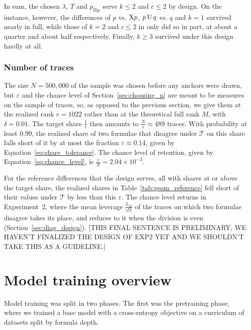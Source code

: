 \documentclass[titlepage,a4paper,11pt]{report}
\DeclareRobustCommand{\RStodo}[1]{\leavevmode{\color{orange!85!black}\textbf{[TODO:}~#1\textbf{]}}}
\begin{document}
    In sum, the chosen $\lambda$, $T$ and $p_{\text{flip}}$ serve $k\le2$ and $c\le2$ by design. On the instance, however, the differences of $p$ vs. $\text{X} p$, $p\,\text{U}\,q$ vs. $q$ and $k=1$ survived nearly in full, while those of $k=2$ and $c\le2$ in only did so in part, at about a quarter and about half respectively. Finally, $k\ge3$ survived under this design hardly at all.

    \subsubsection{Number of traces}\label{sec:geom_sample_size}
    The size $N=500{,}000$ of the sample was chosen before any anchors were drawn, but $\varepsilon$ and the chance level of Section~\ref{sec:choosing_n} are meant to be measures on the sample of traces, so, as opposed to the previous section, we give them at the realized rank $r=1022$ rather than at the theoretical full rank $M$, with $\delta=0.01$. The target share $\frac1r$ then amounts to $\frac Nr\approx489$ traces. With probability at least $0.99$, the realized share of two formulae that disagree under $\mathcal T$ on this share falls short of it by at most the fraction $\varepsilon\approx0.14$, given by  Equation~\eqref{eq:share_tolerance}. The chance level of retention, given by Equation~\eqref{eq:chance_level}, is $\frac rN=2.04\times10^{-3}$.
    
    For the reference differences that the design serves, all with shares at or above the target share, the realized shares in Table~\ref{tab:geom_reference} fell short of their values under $\mathcal T$ by less than this $\varepsilon$. The chance level returns in Experiment~2, where the mean leverage $\frac{L_D}{|D|}$ of the traces on which two formulae disagree takes its place, and reduces to it when the division is even (Section~\ref{sec:diag_design}). [THIS FINAL SENTENCE IS PRELIMINARY, WE HAVEN'T FINALIZED THE DESIGN OF EXP2 YET AND WE SHOULDN'T TAKE THIS AS A GUIDELINE.]


    \section{Model training overview}\label{sec:model_training_overview}
    Model training was split in two phases. The first was the pretraining phase, where we trained a base model with a cross-entropy objective on a curriculum of datasets split by formula depth.
    \RStodo{rewrite to fit actual training flow.}
    
\end{document}
